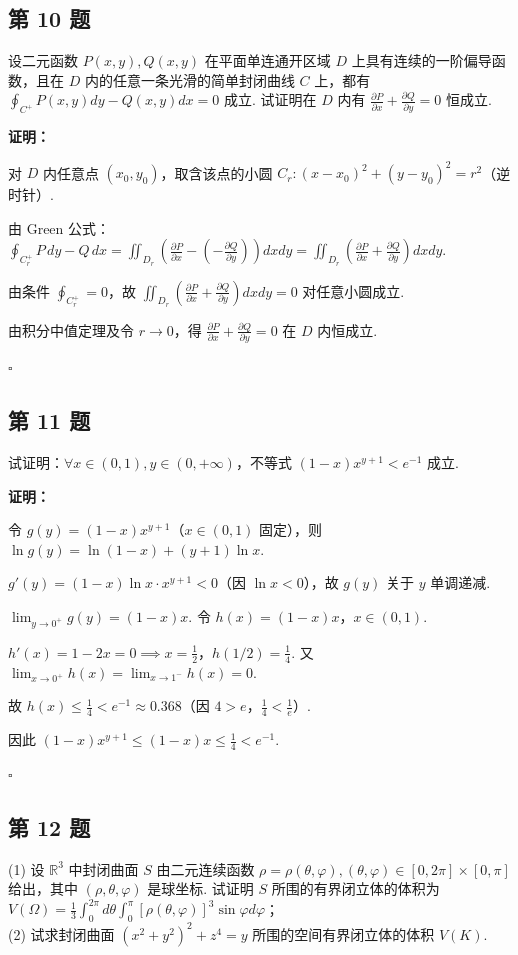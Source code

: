 \documentclass[12pt,a4paper]{article}
\newenvironment{sol}[1][解]{%
  \par\medskip\noindent\textbf{#1：}\itshape\par\noindent\ignorespaces
}{%
  \par\hfill$\square$\par\medskip
}
\begin{document}
\subsection*{第 10 题}
设二元函数 $P(x,y), Q(x,y)$ 在平面单连通开区域 $D$ 上具有连续的一阶偏导函数，且在 $D$
内的任意一条光滑的简单封闭曲线 $C$ 上，都有 $\oint_{C^+}P(x,y)dy-Q(x,y)dx=0$ 成立. 试证明在
$D$ 内有 $\frac{\partial P}{\partial x}+\frac{\partial Q}{\partial y}=0$ 恒成立.

\begin{sol}[证明]对 $D$ 内任意点 $(x_0,y_0)$，取含该点的小圆 $C_r:
  (x-x_0)^2+(y-y_0)^2=r^2$（逆时针）.

  由 Green 公式：$\oint_{C_r^+}P\,dy-Q\,dx=\iint_{D_r}\left(\frac{\partial
    P}{\partial x}-(-\frac{\partial Q}{\partial
  y})\right)dxdy=\iint_{D_r}\left(\frac{\partial P}{\partial
  x}+\frac{\partial Q}{\partial y}\right)dxdy.$

  由条件 $\oint_{C_r^+}=0$，故 $\iint_{D_r}(\frac{\partial P}{\partial
  x}+\frac{\partial Q}{\partial y})dxdy=0$ 对任意小圆成立.

  由积分中值定理及令 $r\to 0$，得 $\frac{\partial P}{\partial x}+\frac{\partial
  Q}{\partial y}=0$ 在 $D$ 内恒成立.
\end{sol}
\subsection*{第 11 题}
试证明：$\forall x\in(0,1), y\in(0,+\infty)$，不等式 $(1-x)x^{y+1}<e^{-1}$ 成立.

\begin{sol}[证明]令 $g(y)=(1-x)x^{y+1}$（$x\in(0,1)$ 固定），则 $\ln
  g(y)=\ln(1-x)+(y+1)\ln x$.

  $g'(y)=(1-x)\ln x\cdot x^{y+1}<0$（因 $\ln x<0$），故 $g(y)$ 关于 $y$ 单调递减.

  $\lim_{y\to 0^+}g(y)=(1-x)x$. 令 $h(x)=(1-x)x$，$x\in(0,1)$.

  $h'(x)=1-2x=0\implies x=\frac{1}{2}$，$h(1/2)=\frac{1}{4}$. 又
  $\lim_{x\to 0^+}h(x)=\lim_{x\to 1^-}h(x)=0$.

  故 $h(x)\le\frac{1}{4}<e^{-1}\approx 0.368$（因 $4>e$，$\frac{1}{4}<\frac{1}{e}$）.

  因此 $(1-x)x^{y+1}\le(1-x)x\le\frac{1}{4}<e^{-1}$.
\end{sol}
\subsection*{第 12 题}
(1) 设 $\mathbb{R}^3$ 中封闭曲面 $S$ 由二元连续函数 $\rho=\rho(\theta,\varphi),
(\theta,\varphi)\in[0,2\pi]\times[0,\pi]$ 给出，其中
$(\rho,\theta,\varphi)$ 是球坐标. 试证明 $S$ 所围的有界闭立体的体积为
$V(\Omega)=\frac{1}{3}\int_{0}^{2\pi}d\theta\int_{0}^{\pi}[\rho(\theta,\varphi)]^3\sin\varphi
d\varphi$；\\
(2) 试求封闭曲面 $(x^2+y^2)^2+z^4=y$ 所围的空间有界闭立体的体积 $V(K)$.
\end{document}
